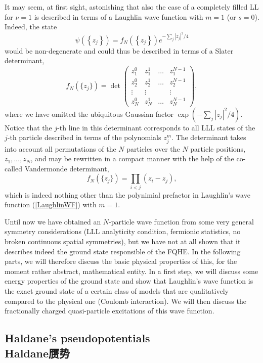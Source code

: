 \documentclass[10pt]{book}
\newcommand{\beq}{\begin{equation}}
\newcommand{\eeq}{\end{equation}}
\begin{document}
It may seem, at first sight, astonishing that also the case of a completely filled LL for $\nu=1$ is described in terms of a 
Laughlin wave function with $m=1$ (or $s=0$). Indeed, the state 
$$
\psi\left(\left\{z_j\right\}\right)=f_N\left(\left\{z_j\right\}\right)
e^{-\sum_j|z_j|^2/4}
$$
would be non-degenerate and could thus be described in terms of
a Slater determinant,
\beq\label{eqSlater}
f_N(\{z_j\})=\det\left(\begin{array}{cccc}
z_1^0 & z_1^1 & \hdots & z_1^{N-1}\\
z_2^0 & z_2^1 & \hdots & z_2^{N-1}\\
\vdots & \vdots & & \vdots\\
z_N^0 & z_N^1 & \hdots & z_N^{N-1}
\end{array}\right),
\eeq
where we have omitted the ubiquitous Gaussian factor $\exp(-\sum_j|z_j|^2/4)$. Notice that the $j$-th line
in this determinant corresponds to all LLL states of the $j$-th particle
described in terms of the polynomials $z_j^m$. The determinant takes into account all permutations
of the $N$ particles over the $N$ particle positions, $z_1, ..., z_N$, and may 
be rewritten in a compact manner with the help of the co-called Vandermonde determinant,
\beq\label{eqVandermonde}
f_N(\{z_j\})=\prod_{i<j}\left(z_i-z_j\right),
\eeq
which is indeed nothing other than the polynimial prefactor in Laughlin's wave function (\ref{LaughlinWF}) with $m=1$.


Until now we have obtained an $N$-particle wave function from some very general symmetry considerations (LLL analyticity condition,
fermionic statistics, no broken continuous spatial symmetries), but we have not at all shown that it describes indeed the 
ground state responsible of the FQHE. In the following parts, we will therefore discuss the basic physical properties 
of this, for the moment rather abstract, mathematical entity. In a first step, we will discuss some energy properties of the
ground state and show that Laughlin's wave function is the exact ground state of a certain class of models that are qualitatively
compared to the physical one (Coulomb interaction). We will then discuss the fractionally charged quasi-particle excitations 
of this wave function.


\subsection[Haldane赝势]{Haldane's pseudopotentials\\\bf Haldane赝势}
\label{HaldanePPsec}
\end{document}

